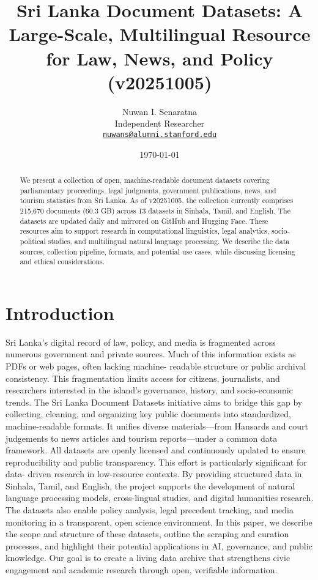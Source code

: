 \documentclass[10pt,a4paper]{article}%
\title{Sri Lanka Document Datasets: A Large{-}Scale, Multilingual Resource for Law, News, and Policy (v20251005)}%
\author{Nuwan I. Senaratna\\Independent Researcher\\\vspace{0.25em}\texttt{\href{mailto:nuwans@alumni.stanford.edu}{nuwans@alumni.stanford.edu}}}%
\date{\today}%
\begin{document}
%
\normalsize%
\maketitle%
\begin{abstract}%
We present a collection of open, machine-readable document datasets covering parliamentary proceedings, legal judgments, government publications, news, and tourism statistics from Sri Lanka. As of v20251005,  the collection currently comprises 215,670  documents (60.3 GB) across 13  datasets in Sinhala, Tamil, and English. The datasets are updated daily and mirrored on GitHub and Hugging Face. These resources aim to support research in computational linguistics, legal analytics, socio-political studies, and multilingual natural language processing. We describe the data sources, collection pipeline, formats, and potential use cases, while discussing licensing and ethical considerations.%
\end{abstract}%
\section{Introduction}%
\label{sec:Introduction}%
Sri Lanka’s digital record of law, policy, and media is fragmented across numerous government and private sources. Much of this information exists as PDFs or web pages, often lacking machine- readable structure or public archival consistency. This fragmentation limits access for citizens, journalists, and researchers interested in the island’s governance, history, and socio-economic trends.%
The Sri Lanka Document Datasets initiative aims to bridge this gap by collecting, cleaning, and organizing key public documents into standardized, machine-readable formats. It unifies diverse materials—from Hansards and court judgements to news articles and tourism reports—under a common data framework. All datasets are openly licensed and continuously updated to ensure reproducibility and public transparency.%
This effort is particularly significant for data- driven research in low-resource contexts. By providing structured data in Sinhala, Tamil, and English, the project supports the development of natural language processing models, cross-lingual studies, and digital humanities research. The datasets also enable policy analysis, legal precedent tracking, and media monitoring in a transparent, open science environment.%
In this paper, we describe the scope and structure of these datasets, outline the scraping and curation processes, and highlight their potential applications in AI, governance, and public knowledge. Our goal is to create a living data archive that strengthens civic engagement and academic research through open, verifiable information.
\end{document}
